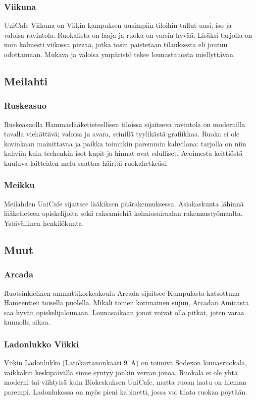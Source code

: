 \documentclass[../ala_hataile.tex]{subfiles}
\begin{document}
\subsubsection*{Viikuna}
UniCafe Viikuna on Viikin kampuksen
uusimpiin tiloihin tullut uusi, iso ja valoisa
ravintola. Ruokalista on laaja ja ruoka on
varsin hyvää. Lisäksi tarjolla on noin kolmesti
viikossa pizzaa, jotka tosin paistetaan tilauksesta eli joutuu odottamaan. Mukava
ja valoisa ympäristö tekee lounastauosta
miellyttävän.
\subsection*{Meilahti}
\subsubsection*{Ruskeasuo}
Ruskeasuolla Hammaslääketieteellisen
tiloissa sijaitseva ravintola on modernilla
tavalla viehättävä; valoisa ja avara, seinillä
tyylikästä grafiikkaa. Ruoka ei ole kovinkaan
mainittavaa ja paikka toimiikin paremmin
kahvilana: tarjolla on niin kahviin
kuin teehenkin isot kupit ja hinnat ovat
edulliset. Avoimesta keittiöstä kuuluva laitteiden
melu saattaa häiritä ruokahetkeäsi.
\subsubsection*{Meikku}
Meilahden UniCafe sijaitsee lääkiksen
pää\-rakennuksessa. Asiakas\-kunta lähinnä
lääke\-tieteen opiskelijoita sekä raksa\-miehiä
kolmio\-sairaalan rakennus\-työ\-maalta. Ystävällinen
henkilökunta.

\subsection*{Muut}
\subsubsection*{Arcada}
Ruotsinkielinen ammatti\-korkea\-koulu Arcada sijaitsee Kumpulasta katsottuna Hämeentien toisella puolella. Mikäli toinen kotimainen sujuu, Arcadan Amicasta saa hyvän opiskelijalounaan. Lounasaikaan jonot voivat olla pitkät, joten varaa kunnolla aikaa.

\subsubsection*{Ladonlukko Viikki}
Viikin Ladonlukko (Latokartanonkaari
9~A) on toimiva Sodexon lounasruokala,
vaikkakin keskipäivällä sinne syntyy
jonkin verran jonoa. Ruokala ei ole yhtä
moderni tai viihtyisä kuin Biokeskuksen
UniCafe, mutta ruoan laatu on hieman parempi.
Ladonlukossa on myös pieni kabinetti,
jossa voi tilata ruokaa pöytään.
\end{document}
